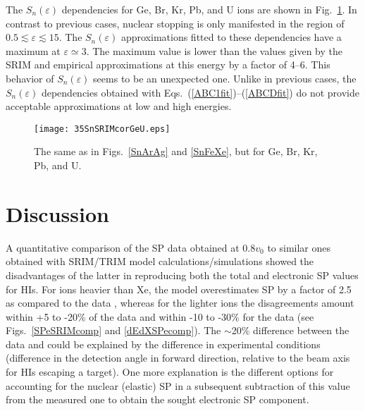 \documentclass[aps,pra,twocolumn,amsmath,amssymb,floatfix]{revtex4-2}
\begin{document}
The $S_{n}(\varepsilon)$ dependencies for Ge, Br, Kr, Pb, and U ions are shown in Fig.~\ref{SnGeU}. In contrast to previous cases, nuclear stopping is only manifested in the region of $0.5 \lesssim \varepsilon \lesssim 15$. The $S_{n}(\varepsilon)$ approximations fitted to these dependencies have a maximum at $\varepsilon \simeq 3$. The maximum value is lower than the values given by the SRIM and empirical approximations at this energy by a factor of 4--6. This behavior of $S_{n}(\varepsilon)$ seems to be an unexpected one. Unlike in previous cases, the $S_{n}(\varepsilon)$ dependencies obtained with Eqs.~(\ref{ABC1fit})--(\ref{ABCDfit})  do not provide acceptable approximations at low and high energies.

\begin{figure}[!h]  %
\begin{center}
\texttt{[image: 35SnSRIMcorGeU.eps]}
\caption{\label{SnGeU} The same as in Figs.~\ref{SnArAg} and \ref{SnFeXe}, but for Ge, Br, Kr, Pb, and U.}
\end{center}
\end{figure}


\section{\label{discus}Discussion}

A quantitative comparison of the SP data obtained at $0.8v_{0}$ to similar ones obtained with SRIM/TRIM model calculations/simulations \cite{SRIM} showed the disadvantages of the latter in reproducing both the total and electronic SP values for HIs. For ions heavier than Xe, the model overestimates SP by a factor of 2.5 as compared to the data \cite{Lennard86}, whereas for the lighter ions the disagreements amount within +5 to -20\% of the data \cite{Fastrup66,Hvelp68} and within -10 to -30\% for the data \cite{Lennard86} (see Figs.~\ref{SPeSRIMcomp} and \ref{dEdXSPecomp}). The $\sim$20\% difference between the data \cite{Fastrup66,Hvelp68} and \cite{Lennard86} could be explained by the difference in experimental conditions (difference in the detection angle in forward direction, relative to the beam axis for HIs escaping a target). One more explanation is the different options for accounting for the nuclear (elastic) SP in a subsequent subtraction of this value from the measured one to obtain the sought electronic SP component.
\end{document}
